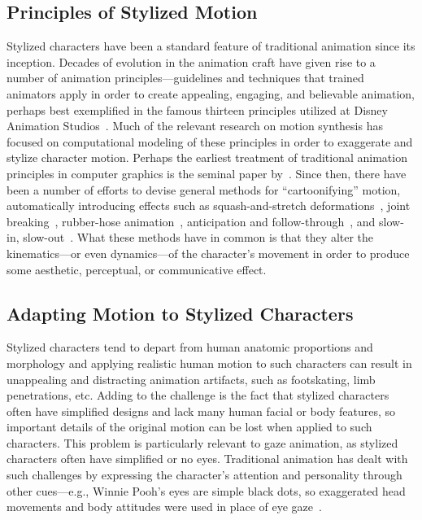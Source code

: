 \subsection{Principles of Stylized Motion}

Stylized characters have been a standard feature of traditional animation since its inception. Decades of evolution in the animation craft have given rise to a number of animation principles---guidelines and techniques that trained animators apply in order to create appealing, engaging, and believable animation, perhaps best exemplified in the famous thirteen principles utilized at Disney Animation Studios~\citep{thomas1981illusion}. Much of the relevant research on motion synthesis has focused on computational modeling of these principles in order to exaggerate and stylize character motion. Perhaps the earliest treatment of traditional animation principles in computer graphics is the seminal paper by~\citet{lasseter1987principles}. Since then, there have been a number of efforts to devise general methods for ``cartoonifying'' motion, automatically introducing effects such as squash-and-stretch deformations~\citep{chenney2002simulating,wang2006filter,kwon2012squash}, joint breaking~\citep{noble2007deform}, rubber-hose animation~\citep{kwon2008exaggerating}, anticipation and follow-through~\citep{choi2004anticipation,wang2006filter,kim2006anticipation}, and slow-in, slow-out~\citep{kwon2011slowin}. What these methods have in common is that they alter the kinematics---or even dynamics---of the character's movement in order to produce some aesthetic, perceptual, or communicative effect.

\subsection{Adapting Motion to Stylized Characters}

Stylized characters tend to depart from human anatomic proportions and morphology and applying realistic human motion to such characters can result in unappealing and distracting animation artifacts, such as footskating, limb penetrations, etc. Adding to the challenge is the fact that stylized characters often have simplified designs and lack many human facial or body features, so important details of the original motion can be lost when applied to such characters. This problem is particularly relevant to gaze animation, as stylized characters often have simplified or no eyes. Traditional animation has dealt with such challenges by expressing the character's attention and personality through other cues---e.g., Winnie Pooh's eyes are simple black dots, so exaggerated head movements and body attitudes were used in place of eye gaze~\cite{thomas1981illusion}.


